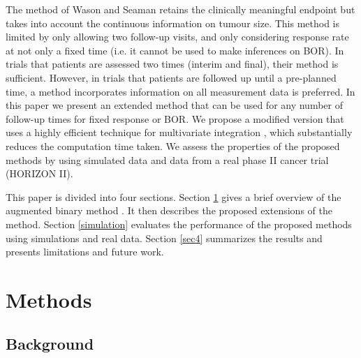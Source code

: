 \documentclass[10pt,A4]{article}
\begin{document}
The method of Wason and Seaman \cite{Wason2013} retains the clinically meaningful endpoint but takes into account the continuous information on tumour size. This method is limited by only allowing two follow-up visits, and only considering response rate at not only a fixed time (i.e. it cannot be used to make inferences on BOR). In trials that patients are assessed two times (interim and final), their method is sufficient. However, in trials that patients are followed up until a pre-planned time, a method incorporates information on all measurement data is preferred. In this paper we present an extended method that can be used for any number of follow-up times for fixed response or BOR. We propose a modified version that uses a highly efficient technique for multivariate integration \cite{Genz2009}, which substantially reduces the computation time taken. We assess the properties of the proposed methods by using simulated data and data from a real phase II cancer trial (HORIZON II).

This paper is divided into four sections. Section \ref{sec2} gives a brief overview of the augmented binary method \cite{Wason2013}. It then describes the proposed extensions of the method. Section \ref{simulation} evaluates the performance of the proposed methods using simulations and real data. Section \ref{sec4} summarizes the results and presents limitations and future work.


\section{Methods}
\label{sec2}
\subsection{Background}
\end{document}

